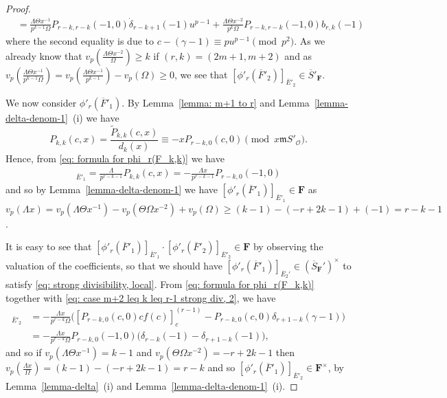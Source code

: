 \documentclass[11pt]{amsart}
\theoremstyle{definition}
\numberwithin{equation}{subsection}
\theoremstyle{plain}
\theoremstyle{plain}
\theoremstyle{plain}
\theoremstyle{plain}
\theoremstyle{plain}
\theoremstyle{plain}
\theoremstyle{plain}
\theoremstyle{plain}
\theoremstyle{plain}
\theoremstyle{plain}
\theoremstyle{plain}
\theoremstyle{plain}
\theoremstyle{definition}
\theoremstyle{definition}
\theoremstyle{definition}
\theoremstyle{remark}
\renewcommand{\(}{\textup{(}}
\renewcommand{\)}{\textup{)}}
\newcommand{\F}{\mathbf{F}}
\newcommand{\barS}{\overline{S}}
\newcommand{\fm}{\mathfrak{m}}
\newcommand{\cO}{\mathcal{O}}
\newcommand{\barE}{\overline{E}}
\newcommand{\barF}{\overline{F}}
\begin{document}
\begin{proof}
\begin{align*}
&=\frac{\Lambda\Theta x^{-1}}{p^{k-1}\Omega} P_{r-k,r-k}(-1,0)\dot{\delta}_{r-k+1}(-1)u^{p-1} + \frac{\Lambda\Theta x^{-2}}{p^k\Omega} P_{r-k,r-k}(-1,0)b_{r,k}(-1)
\end{align*}
where the second equality is due to $c-(\gamma-1)\equiv pu^{p-1}\pmod{p^2}$. As we already know that $v_p(\frac{\Lambda\Theta x^{-2}}{\Omega})\geq k$ if $(r,k)=(2m+1,m+2)$ and as $v_p(\frac{\Lambda\Theta x^{-1}}{p^{k-1}\Omega})=v_p(\frac{\Lambda\Theta x^{-1}}{p^{k-1}})-v_p(\Omega)\geq 0$, we see that $[\phi'_r(\barF'_2)]_{\barE'_2}\in \barS'_\F$.


We now consider $\phi'_r(\barF'_1)$. By Lemma~\ref{lemma: m+1 to r} and Lemma~\ref{lemma-delta-denom-1}~(i) we have
\begin{equation}\label{eq: case m+2 leq k leq r-1 strong div, 2}
P_{k,k}(c,x)=\frac{\tilde{P}_{k,k}(c,x)}{d_{k}(x)}\equiv-xP_{r-k,0}(c,0)\pmod{x\fm S'_\cO}.
\end{equation}
Hence, from \eqref{eq: formula for phi_r(F_k,k)} we have
\begin{align*}
[\phi'_r(\barF'_1)]_{\barE'_1}=\frac{\Lambda }{p^{r-k-1}}P_{k,k}(c,x)=-\frac{\Lambda x}{p^{r-k-1}}P_{r-k,0}(-1,0)
\end{align*}
and so by Lemma~\ref{lemma-delta-denom-1} we have $[\phi'_r(\barF'_1)]_{\barE'_1}\in\F$ as $v_p(\Lambda x)=v_p(\Lambda\Theta x^{-1})-v_p(\Theta\Omega x^{-2})+v_p(\Omega)\geq (k-1)-(-r+2k-1)+(-1)=r-k-1$.

It is easy to see that $[\phi'_r(\barF'_1)]_{\barE'_1}\cdot[\phi'_r(\barF'_2)]_{\barE'_2}\in\F$ by observing the valuation of the coefficients, so that we should have $[\phi'_r(\barF'_1)]_{\barE_2'}\in (\barS_\F')^\times$ to satisfy \eqref{eq: strong divisibility, local}.
From \eqref{eq: formula for phi_r(F_k,k)} together with \eqref{eq: case m+2 leq k leq r-1 strong div, 2}, we have
\begin{align*}
[\phi'_r(\barF'_1)]_{\barE'_2}&=-\frac{\Lambda x}{p^{r-k}\Omega} \big([P_{r-k,0}(c,0)cf(c)]_c^{(r-1)}-P_{r-k,0}(c,0)\delta_{r+1-k}(\gamma-1)\big)\\
&=-\frac{\Lambda x}{p^{r-k}\Omega} P_{r-k,0}(-1,0)\big(\delta_{r-k}(-1)-\delta_{r+1-k}(-1)\big),
\end{align*}
and so if $v_p(\Lambda\Theta x^{-1})=k-1$ and $v_p(\Theta\Omega x^{-2})=-r+2k-1$ then $v_p(\frac{\Lambda x}{\Omega})=(k-1)-(-r+2k-1)=r-k$ and so $[\phi'_r(\barF'_1)]_{\barE'_2}\in\F^{\times}$, by Lemma~\ref{lemma-delta}~(i) and Lemma~\ref{lemma-delta-denom-1}~(i).



\end{proof}
\end{document}
